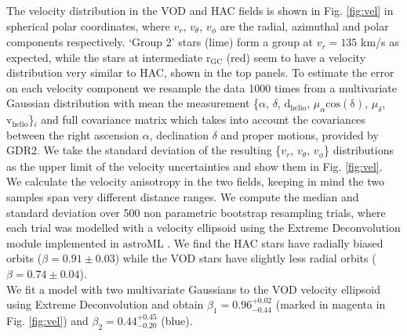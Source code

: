 \documentclass[fleqn,usenatbib]{mnras}
\begin{document}
%
The velocity distribution in the VOD and HAC fields is shown in Fig. \ref{fig:vel} in spherical polar coordinates, where $v_{r}$, $v_{\theta}$, $v_{\phi}$  are the radial, azimuthal and polar components respectively. `Group 2' stars (lime) form a group at $v_{r} = 135$ km/s as expected, while the stars at intermediate $\mathrm{r_{GC}}$ (red) seem to have a velocity distribution very similar to HAC, shown in the top panels. To estimate the error on each velocity component we resample the data 1000 times  from a multivariate Gaussian distribution with mean the measurement \{$\alpha$, $\delta$, $\mathrm{d_{helio}}$, $\mu_{\alpha} \mathrm{cos(\delta)}$, $\mu_{\delta}$, $\mathrm{v_{helio}}$\}$_{i}$ and full covariance matrix which takes into account the covariances between the right ascension $\alpha$, declination $\delta$ and proper motions, provided by GDR2. We take the standard deviation of the resulting \{$v_{r}$, $v_{\theta}$, $v_{\phi}$\} distributions as the upper limit of the velocity uncertainties and show them in Fig. \ref{fig:vel}. \\ %
We calculate the velocity anisotropy in the two fields, keeping in mind the two samples span very different distance ranges. 
We compute the median and standard deviation over 500 non parametric bootstrap resampling trials, where each trial was modelled with a velocity ellipsoid using the Extreme Deconvolution module implemented in  $\mathrm{astroML}$ \citep{astroML}. We find the HAC stars have radially biased orbits ($\beta = 0.91 \pm 0.03$) while the VOD stars have slightly less radial orbits ($\beta = 0.74 \pm 0.04$).\\
We fit a model with two multivariate Gaussians to the VOD velocity ellipsoid using Extreme Deconvolution and obtain  $\beta_{1}= 0.96^{+0.02}_{-0.44}$ (marked in magenta in Fig. \ref{fig:vel}) and $\beta_{2}=0.44^{+0.45}_{-0.20}$ (blue).
\end{document}
